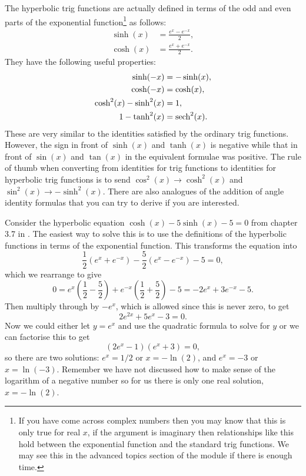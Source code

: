 The hyperbolic trig functions are actually defined in terms of the odd and even parts of the exponential function\footnote{If you have come across complex numbers then you may know that this is only true for real $x$, if the argument is imaginary then relationships like this hold between the exponential function and the standard trig functions. We may see this in the advanced topics section of the module if there is enough time.} as follows:
\begin{align}
\sinh(x)&=\frac{e^{x}-e^{-x}}{2}, \label{eq: sinh exp}\\
\cosh(x)&=\frac{e^{x}+e^{-x}}{2}. \label{eq: cosh exp}
\end{align}
They have the following useful properties:
\begin{align*}
\sinh(-x)&=-\sinh(x),\\
\cosh(-x)&=\cosh(x),\\
\cosh^{2}(x)-\sinh^{2}(x)&=1,\\
1-\tanh^{2}(x)&=\operatorname{sech}^{2}(x).
\end{align*}
These are very similar to the identities satisfied by the ordinary trig functions. However, the sign in front of $\sinh(x)$ and $\tanh(x)$ is negative while that in front of $\sin(x)$ and $\tan(x)$ in the equivalent formulae was positive. The rule of thumb when converting from identities for trig functions to identities for hyperbolic trig functions is to send $\cos^{2}(x)\to \cosh^{2}(x)$ and $\sin^{2}(x)\to -\sinh^{2}(x)$.  There are also analogues of the addition of angle identity formulas that you can try to derive if you are interested.\\


\begin{ex}
Consider the hyperbolic equation $\cosh(x)-5\sinh(x)-5=0$ from chapter 3.7 in \citep{riley_mathematical_2006}. The easiest way to solve this is to use the definitions of the hyperbolic functions in terms of the exponential function. This transforms the equation into
\begin{equation*}
\frac{1}{2}\left(e^{x}+e^{-x}\right)-\frac{5}{2}\left(e^{x}-e^{-x}\right)-5=0,
\end{equation*}
which we rearrange to give
\begin{equation*}
0=e^{x}\left(\frac{1}{2}-\frac{5}{2}\right)+e^{-x}\left(\frac{1}{2}+\frac{5}{2}\right)-5=-2e^{x}+3e^{-x}-5.
\end{equation*}
Then multiply through by $-e^{x}$, which is allowed since this is never zero, to get
\begin{equation*}
2e^{2x}+5e^{x}-3=0.
\end{equation*}
Now we could either let $y=e^{x}$ and use the quadratic formula to solve for $y$ or we can factorise this to get
\begin{equation*}
\left(2e^{x}-1\right)\left(e^{x}+3\right)=0,
\end{equation*}
so there are two solutions: $e^{x}=1/2$ or $x=-\ln(2)$, and $e^{x}=-3$ or $x=\ln(-3)$. Remember we have not discussed how to make sense of the logarithm of a negative number so for us there is only one real solution, $x=-\ln(2)$.
\end{ex}


